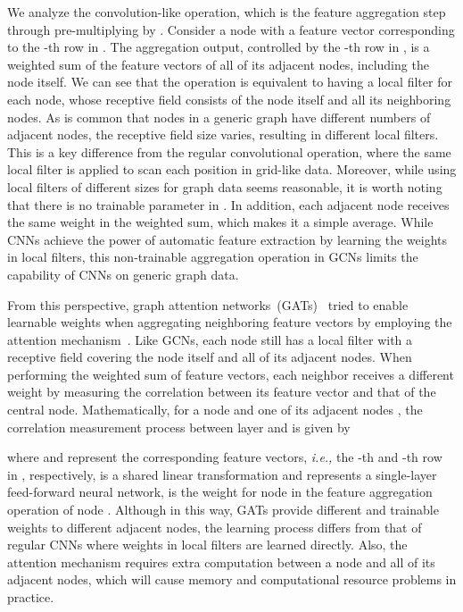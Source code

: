 \documentclass[sigconf]{acmart}
\begin{document}
We analyze the convolution-like operation, which is the feature
aggregation step through pre-multiplying  by
. Consider a
node with a feature vector corresponding to the -th row in
. The aggregation output, controlled by the -th row in
, is a weighted
sum of the feature vectors of all of its adjacent nodes, including
the node itself. We can see that the operation is equivalent to
having a local filter for each node, whose receptive field consists
of the node itself and all its neighboring nodes. As is common that
nodes in a generic graph have different numbers of adjacent nodes,
the receptive field size varies, resulting in different local
filters. This is a key difference from the regular convolutional
operation, where the same local filter is applied to scan each
position in grid-like data. Moreover, while using local filters of
different sizes for graph data seems reasonable, it is worth noting
that there is no trainable parameter in
. In addition,
each adjacent node receives the same weight in the weighted sum,
which makes it a simple average. While CNNs achieve the power of
automatic feature extraction by learning the weights in local
filters, this non-trainable aggregation operation in GCNs limits the
capability of CNNs on generic graph data.


From this perspective, graph attention
networks~(GATs)~\cite{velivckovic2017graph} tried to enable
learnable weights when aggregating neighboring feature vectors by
employing the attention
mechanism~\cite{bahdanau2014neural,vaswani2017attention}. Like GCNs,
each node still has a local filter with a receptive field covering
the node itself and all of its adjacent nodes. When performing the
weighted sum of feature vectors, each neighbor receives a different
weight by measuring the correlation between its feature vector and
that of the central node. Mathematically, for a node  and one of
its adjacent nodes , the correlation measurement process between
layer  and  is given by

where  and  represent the corresponding
feature vectors, \emph{i.e.,} the -th and -th row in ,
respectively,  is a shared linear transformation and 
represents a single-layer feed-forward neural network,
 is the weight for node  in the feature
aggregation operation of node . Although in this way, GATs
provide different and trainable weights to different adjacent nodes,
the learning process differs from that of regular CNNs where weights
in local filters are learned directly. Also, the attention mechanism
requires extra computation between a node and all of its adjacent
nodes, which will cause memory and computational resource problems
in practice.
\end{document}
